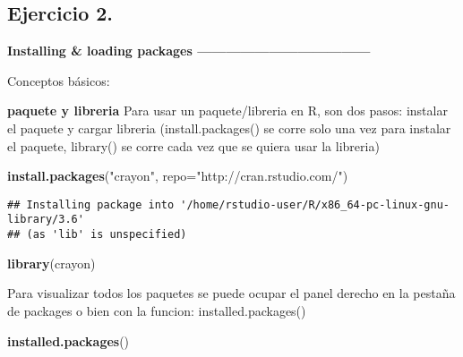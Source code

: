 \documentclass[]{book}
\newenvironment{Shaded}{\begin{snugshade}}{\end{snugshade}}
\newcommand{\DataTypeTok}[1]{\textcolor[rgb]{0.13,0.29,0.53}{#1}}
\newcommand{\KeywordTok}[1]{\textcolor[rgb]{0.13,0.29,0.53}{\textbf{#1}}}
\newcommand{\NormalTok}[1]{#1}
\newcommand{\StringTok}[1]{\textcolor[rgb]{0.31,0.60,0.02}{#1}}
\begin{document}
\hypertarget{ejercicio-2.}{%
\subsection{Ejercicio 2.}\label{ejercicio-2.}}

\textbf{Installing \& loading packages ------------------------------------}

Conceptos básicos:

\textbf{paquete y libreria} Para usar un paquete/libreria en R, son dos pasos: instalar el paquete y cargar libreria (install.packages() se corre solo una vez para instalar el paquete, library() se corre cada vez que se quiera usar la libreria)

\begin{Shaded}
\begin{Highlighting}[]
\KeywordTok{install.packages}\NormalTok{(}\StringTok{"crayon"}\NormalTok{, }\DataTypeTok{repo=}\StringTok{"http://cran.rstudio.com/"}\NormalTok{)}
\end{Highlighting}
\end{Shaded}

\begin{verbatim}
## Installing package into '/home/rstudio-user/R/x86_64-pc-linux-gnu-library/3.6'
## (as 'lib' is unspecified)
\end{verbatim}

\begin{Shaded}
\begin{Highlighting}[]
\KeywordTok{library}\NormalTok{(crayon)}
\end{Highlighting}
\end{Shaded}

Para visualizar todos los paquetes se puede ocupar el panel derecho en la pestaña de packages o bien con la funcion: installed.packages()

\begin{Shaded}
\begin{Highlighting}[]
\KeywordTok{installed.packages}\NormalTok{()}
\end{Highlighting}
\end{Shaded}
\end{document}
